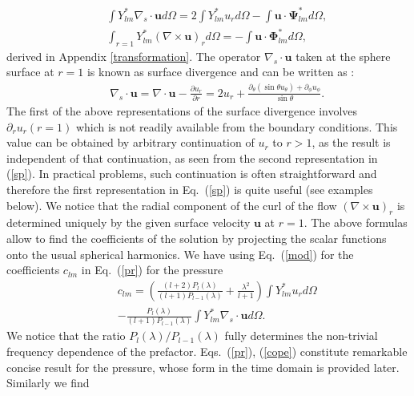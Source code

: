 \documentclass[aps,prx,twocolumn,amsmath,amssymb,amsfonts]{revtex4-2}
\begin{document}
\begin{eqnarray}&&\!\!\!\!\!\!\!
\int  Y_{lm}^* \nabla_s\cdot\bm u d\Omega=
2\int Y_{lm}^* u_r  d\Omega - \int \bm u\cdot \bm \Psi_{lm}^* d\Omega
,\nonumber\\&&\!\!\!\!\!\!\!
\int_{r=1}  Y_{lm}^* (\nabla\!\times\! \bm u)_r d\Omega=
-\int \bm u\cdot \bm \Phi_{lm}^* d\Omega,\label{cd}
\end{eqnarray}
derived in Appendix \ref{transformation}. The operator $\nabla_s\cdot\bm u$ taken at the sphere surface at $r=1$ is known as surface divergence and can be written as \cite{kim}:
\begin{eqnarray}&&\!\!\!\!\!\!\!
\nabla_s\!\cdot\!\bm u\!=\!\nabla\cdot \bm u\!-\!\frac{\partial u_r}{\partial r}\!=\!2u_r\!+\!\frac{\partial_{\theta}(\sin\theta u_{\theta})\!+\!\partial_{\phi}u_{\phi}}{\sin\theta}. \label{sp}
\end{eqnarray}
The first of the above representations of the surface divergence involves $\partial_r u_r(r=1)$ which is not readily available from the boundary conditions. This value can be obtained by arbitrary continuation of $u_r$ to $r>1$, as the result is independent of that continuation, as seen from the second representation in (\ref{sp}). In practical problems, such continuation is often straightforward and therefore the first representation in Eq.~(\ref{sp}) is quite useful (see examples below). We notice that the radial component of the curl of the flow $(\nabla\!\times\! \bm u)_r$ is determined uniquely by the given surface velocity $\bm u$ at $r\!=\!1$. The above formulas allow to find the coefficients of the solution by projecting the scalar functions onto the usual spherical harmonics. We have using Eq.~(\ref{mod}) for the coefficients $c_{lm}$ in Eq.~(\ref{pr}) for the pressure
\begin{eqnarray}&&
c_{lm}\!=\! \left(\! \frac{(l\!+\!2)P_l(\lambda)}{(l\!+\!1)P_{l-1}(\lambda)} \!+\!\frac{\lambda^2}{l\!+\!1}\right)\!\int\!Y_{lm}^* u_r d\Omega
\nonumber\\&&
-\frac{P_l(\lambda)}{(l\!+\!1)P_{l-1}(\lambda)}\int \! Y_{lm}^* \nabla_s\!\cdot\!\bm u d\Omega.\label{cope}
\end{eqnarray}
We notice that the ratio $P_l(\lambda)/P_{l-1}(\lambda)$ fully determines the non-trivial frequency dependence of the prefactor. Eqs.~(\ref{pr}), (\ref{cope}) constitute remarkable concise result for the pressure, whose form in the time domain is provided later. Similarly we find
\end{document}
